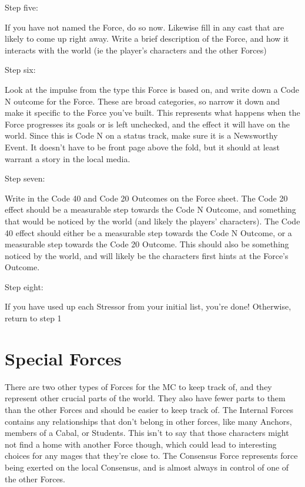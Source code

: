 \documentclass[
  oneside,
  statementpaper,
  9pt]{memoir}
\begin{document}
Step five:

If you have not named the Force, do so now. Likewise fill in any cast
that are likely to come up right away. Write a brief description of the
Force, and how it interacts with the world (ie the player's characters
and the other Forces)

Step six:

Look at the impulse from the type this Force is based on, and write down
a Code N outcome for the Force. These are broad categories, so narrow it
down and make it specific to the Force you've built. This represents
what happens when the Force progresses its goals or is left unchecked,
and the effect it will have on the world. Since this is Code N on a
status track, make sure it is a Newsworthy Event. It doesn't have to be
front page above the fold, but it should at least warrant a story in the
local media.

Step seven:

Write in the Code 40 and Code 20 Outcomes on the Force sheet. The Code
20 effect should be a measurable step towards the Code N Outcome, and
something that would be noticed by the world (and likely the players'
characters). The Code 40 effect should either be a measurable step
towards the Code N Outcome, or a measurable step towards the Code 20
Outcome. This should also be something noticed by the world, and will
likely be the characters first hints at the Force's Outcome.

Step eight:

If you have used up each Stressor from your initial list, you're done!
Otherwise, return to step 1

\hypertarget{special-forces}{%
\section{Special Forces}\label{special-forces}}

There are two other types of Forces for the MC to keep track of, and
they represent other crucial parts of the world. They also have fewer
parts to them than the other Forces and should be easier to keep track
of. The Internal Forces contains any relationships that don't belong in
other forces, like many Anchors, members of a Cabal, or Students. This
isn't to say that those characters might not find a home with another
Force though, which could lead to interesting choices for any mages that
they're close to. The Consensus Force represents force being exerted on
the local Consensus, and is almost always in control of one of the other
Forces.
\end{document}
